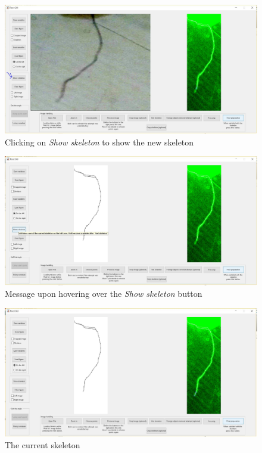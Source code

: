 \begin{figure}[H]
	\centering
	\includegraphics[width=\textwidth]{../Figures/manual/optionalB4.jpg}
	\caption{Clicking on \textit{Show skeleton} to show the new skeleton}
	\label{fig:img40}
\end{figure}

\begin{figure}[H]
	\centering
	\includegraphics[width=\textwidth]{../Figures/manual/optionalB5.jpg}
	\caption{Message upon hovering over the \textit{Show skeleton} button}
	\label{fig:img41}
\end{figure}

\begin{figure}[H]
	\centering
	\includegraphics[width=\textwidth]{../Figures/manual/optionalB6.jpg}
	\caption{The current skeleton}
	\label{fig:img42}
\end{figure}

